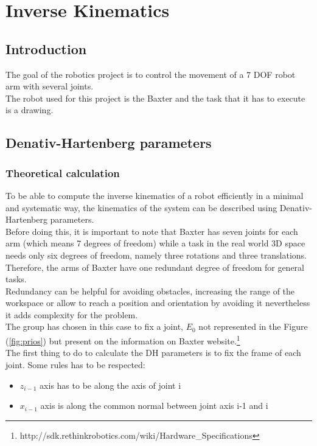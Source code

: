 \chapter{Inverse Kinematics}
\label{chap:inv kin}


\section{Introduction}

The goal of the robotics project is to control the movement of a 7 DOF robot arm with several joints.\\
The robot used for this project is the Baxter and the task that it has to execute is a drawing.


\section{Denativ-Hartenberg parameters}
\subsection{Theoretical calculation}
To be able to compute the inverse kinematics of a robot efficiently in a minimal and systematic way, the kinematics of the system can be described using Denativ-Hartenberg parameters. \\
Before doing this, it is important to note that Baxter has seven joints for each arm (which means 7 degrees of freedom) while a task in the real world 3D space needs only six degrees of freedom, namely three rotations and three translations. Therefore, the arms of Baxter have one redundant degree of freedom for general tasks.\\
Redundancy can be helpful for avoiding obstacles, increasing the range of the workspace or allow to reach a position and orientation by avoiding it nevertheless it adds complexity for the problem.\\
The group has chosen in this case to fix a joint, $E_0$ not represented in the Figure (\ref{fig:prios}) but present on the information on Baxter website.\footnote{http://sdk.rethinkrobotics.com/wiki/Hardware\_Specifications} \\

The first thing to do to calculate the DH parameters is to fix the frame of each joint. Some rules has to be respected: \\
\begin{itemize}
\item $z_{i-1}$ axis has to be along the axis of joint i
\item $x_{i-1}$ axis is along the common normal between joint axis i-1 and i
\end{itemize}

